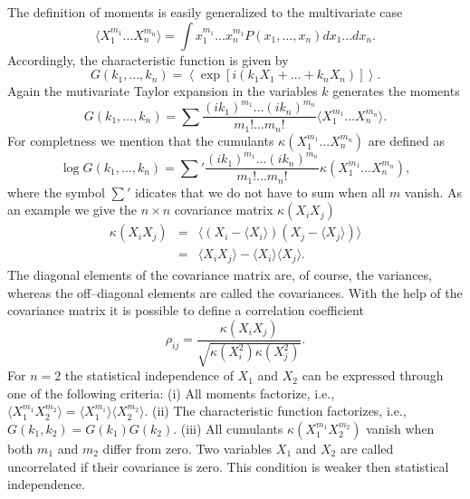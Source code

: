 The definition of moments is easily generalized to the  
multivariate case
\begin{equation}
\langle X_1^{m_1} \ldots X_n^{m_n} \rangle =
\int x_1^{m_1} \ldots x_n^{m_1} P(x_1, \ldots, x_n) dx_1 \ldots 
dx_n.
\end{equation}
Accordingly, the characteristic function is given by
\begin{equation}
G(k_1, \dots, k_n) = \left\langle 
\exp[i(k_1X_1 + \ldots +k_n X_n)]\right\rangle.
\end{equation}
Again the mutivariate Taylor expansion in the variables $k$ 
generates the moments
\begin{equation}
G(k_1, \dots, k_n) = \sum \frac{(ik_1)^{m_1} \ldots (ik_n)^{m_n}}
                  {m_1! \ldots m_n!} 
       \langle X_1^{m_1} \ldots X_n^{m_n} \rangle.
\end{equation}
For completness we mention that the cumulants 
$\kappa(X_1^{m_1} \ldots X_n^{m_n})$ are defined as
\begin{equation}
\log G(k_1, \dots, k_n) = \sum' \frac{(ik_1)^{m_1} \ldots (ik_n)^{m_n}}
                  {m_1! \ldots m_n!} 
       \kappa(X_1^{m_1} \ldots X_n^{m_n}),
\end{equation}
where the symbol $\sum'$ idicates that we do not have to sum when 
all $m$ vanish. As an example we give the $n \times n$ covariance
matrix $\kappa(X_i X_j)$
\begin{eqnarray}
\kappa(X_i X_j) &=& 
 \langle (X_i-\langle X_i \rangle)(X_j-\langle X_j \rangle)\rangle 
 \\
 & = & \langle X_i X_j \rangle - \langle X_i \rangle \langle X_j 
           \rangle.
 \end{eqnarray}
The diagonal elements of the covariance matrix are, of course, the 
variances, whereas the off--diagonal elements are called the 
covariances.
With the help of the covariance matrix it is possible to define a 
correlation coefficient
\begin{equation}
\rho_{ij} = \frac{\kappa(X_i X_j)}{\sqrt{\kappa(X_i^2) 
\kappa(X_j^2)}}.
\end{equation}
For $n=2$ the statistical independence of $X_1$ and $X_2$ can be 
expressed through one of the following criteria: (i) All moments 
factorize, i.e., $\langle X_1^{m_1} X_2^{m_2}\rangle= 
\langle X_1^{m_1}\rangle \langle X_2^{m_2}\rangle$. (ii) The 
characteristic function factorizes, i.e., $G(k_1,k_2) = 
G(k_1)G(k_2)$. (iii) All cumulants $\kappa(X_1^{m_1}X_2^{m_2})$ 
vanish when both $m_1$ and $m_2$ differ from zero. Two variables $X_1$
and $X_2$ are called uncorrelated if their covariance is zero. 
This condition is weaker then statistical independence.

